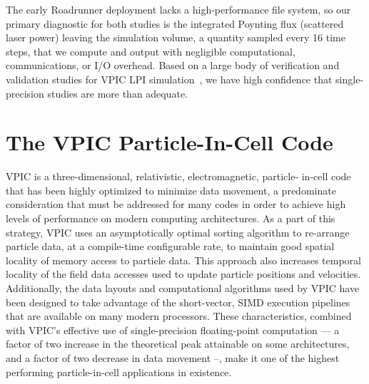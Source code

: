 \documentclass[letter,10pt]{article}
\begin{document}
The early Roadrunner deployment lacks a high-performance file system,
so our primary diagnostic for both studies is the integrated Poynting
flux (scattered laser power) leaving the simulation volume, a quantity
sampled every 16 time steps, that we compute and output with
negligible computational, communications, or I/O overhead.  Based on a
large body of verification and validation studies for VPIC LPI
simulation~\cite{}, we have high confidence that single-precision
studies are more than adequate.

\section*{The VPIC Particle-In-Cell Code}

VPIC is a three-dimensional, relativistic, electromagnetic, particle-
in-cell code that has been highly optimized to minimize data movement, 
a predominate consideration that must be addressed for many codes in 
order to achieve high levels of performance on modern computing 
architectures.  As a part of this strategy, VPIC uses an 
asymptotically optimal sorting algorithm to re-arrange particle data, 
at a compile-time configurable rate, to maintain good spatial locality 
of memory access to particle data.  This approach also increases 
temporal locality of the field data accesses used to update particle 
positions and velocities.  Additionally, the data layouts and 
computational algorithms used by VPIC have been designed to take 
advantage of the short-vector, SIMD execution pipelines that are 
available on many modern processors.  These characteristics, combined 
with VPIC's effective use of single-precision floating-point 
computation --- a factor of two increase in the theoretical peak 
attainable on some architectures, and a factor of two decrease in data 
movement --, make it one of the highest performing particle-in-cell 
applications in existence.
\end{document}
